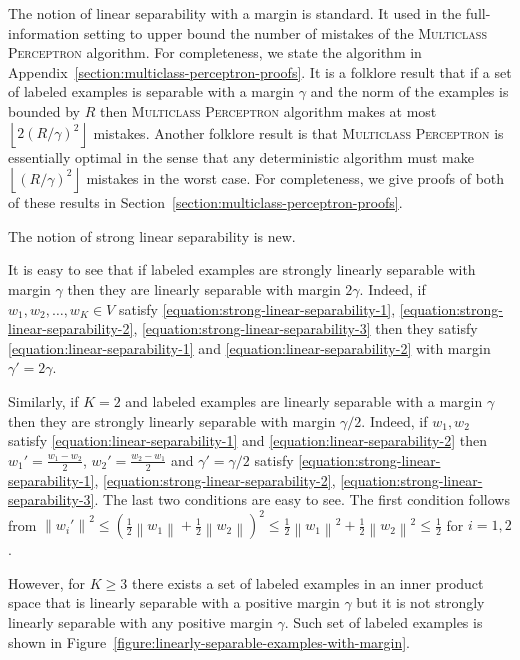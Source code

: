 \documentclass[12pt]{article}
\newcommand{\norm}[1]{\left\| #1 \right\|}  %
\begin{document}
The notion of linear separability with a margin is standard. It used in the
full-information setting to upper bound the number of mistakes of the
\textsc{Multiclass Perceptron} algorithm. For completeness, we state the
algorithm in Appendix~\ref{section:multiclass-perceptron-proofs}. It is a
folklore result that if a set of labeled examples is separable with a margin
$\gamma$ and the norm of the examples is bounded by $R$ then \textsc{Multiclass
Perceptron} algorithm makes at most $\left\lfloor 2(R/\gamma)^2 \right \rfloor$
mistakes. Another folklore result is that \textsc{Multiclass Perceptron} is
essentially optimal in the sense that any deterministic algorithm must make
$\left\lfloor (R/\gamma)^2 \right \rfloor$ mistakes in the worst case. For
completeness, we give proofs of both of these results in
Section~\ref{section:multiclass-perceptron-proofs}.

The notion of strong linear separability is new.

It is easy to see that if labeled examples are strongly linearly
separable with margin $\gamma$ then they are linearly separable with margin
$2\gamma$. Indeed, if $w_1, w_2, \dots, w_K \in V$
satisfy \eqref{equation:strong-linear-separability-1},
\eqref{equation:strong-linear-separability-2},
\eqref{equation:strong-linear-separability-3} then they satisfy
\eqref{equation:linear-separability-1} and
\eqref{equation:linear-separability-2} with margin $\gamma' = 2\gamma$.

Similarly, if $K=2$ and labeled examples are linearly separable with a margin
$\gamma$ then they are strongly linearly separable with margin $\gamma/2$.
Indeed, if $w_1, w_2$ satisfy \eqref{equation:linear-separability-1} and
\eqref{equation:linear-separability-2} then $w_1' = \frac{w_1 - w_2}{2}$, $w_2' =
\frac{w_2 - w_1}{2}$ and $\gamma'=\gamma/2$ satisfy
\eqref{equation:strong-linear-separability-1},
\eqref{equation:strong-linear-separability-2},
\eqref{equation:strong-linear-separability-3}. The last two conditions are easy
to see. The first condition follows from $\norm{w_i'}^2 \le (\frac{1}{2}
\norm{w_1} + \frac{1}{2} \norm{w_2})^2 \le \frac{1}{2}\norm{w_1}^2 +
\frac{1}{2}\norm{w_2}^2 \le \frac{1}{2}$ for $i=1,2$.

However, for $K \ge 3$ there exists a set of labeled examples in an inner product
space that is linearly separable with a positive margin $\gamma$ but it is not
strongly linearly separable with any positive margin $\gamma$. Such set of labeled
examples is shown in
Figure~\ref{figure:linearly-separable-examples-with-margin}.
\end{document}
